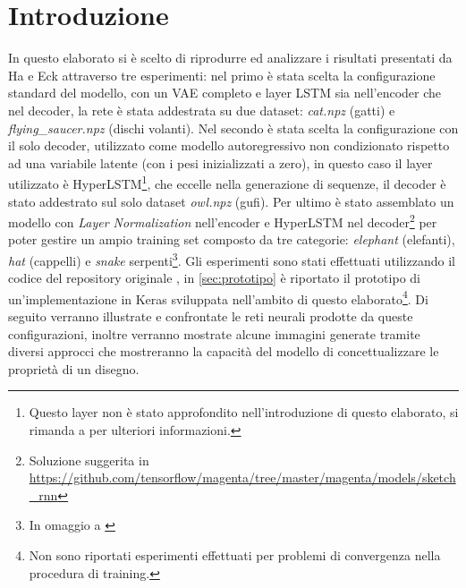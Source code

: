 \section{Introduzione} %
\label{sec:introduzione}
In questo elaborato si è scelto di riprodurre ed analizzare i risultati presentati da Ha e Eck attraverso tre esperimenti: nel primo è stata scelta la configurazione standard del modello, con un VAE completo e layer LSTM sia nell'encoder che nel decoder, la rete è stata addestrata su due dataset: \textit{cat.npz} (gatti) e \textit{flying\_saucer.npz} (dischi volanti). Nel secondo è stata scelta la configurazione con il solo decoder, utilizzato come modello autoregressivo non condizionato rispetto ad una variabile latente (con i pesi inizializzati a zero), in questo caso il layer utilizzato è HyperLSTM\footnote{Questo layer non è stato approfondito nell'introduzione di questo elaborato, si rimanda a \cite{hyperlstm} per ulteriori informazioni.}, che eccelle nella generazione di sequenze, il decoder è stato addestrato sul solo dataset \textit{owl.npz} (gufi). Per ultimo è stato assemblato un modello con \textit{Layer Normalization} nell'encoder e HyperLSTM nel decoder\footnote{Soluzione suggerita in \url{https://github.com/tensorflow/magenta/tree/master/magenta/models/sketch_rnn}} per poter gestire un ampio training set composto da tre categorie: \textit{elephant} (elefanti), \textit{hat} (cappelli) e \textit{snake} serpenti\footnote{In omaggio a \cite{petitprince}}. Gli esperimenti sono stati effettuati utilizzando il codice del repository originale \cite{sketchrepo}, in \ref{sec:prototipo} è riportato il prototipo di un'implementazione in Keras sviluppata nell'ambito di questo elaborato\footnote{Non sono riportati esperimenti effettuati per problemi di convergenza nella procedura di training.}. Di seguito verranno illustrate e confrontate le reti neurali prodotte da queste configurazioni, inoltre verranno mostrate alcune immagini generate tramite diversi approcci che mostreranno la capacità del modello di concettualizzare le proprietà di un disegno.

